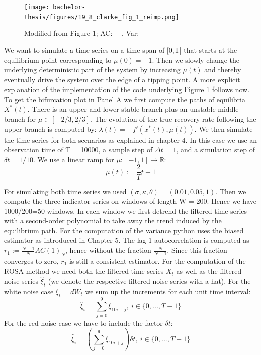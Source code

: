 \documentclass[%
thesis=student,%
coverpage=false,%
titlepage=false,%
headmarks=true, %
english,%
font=libertine, %
math=newpxtx, %
BCOR=5mm,%
coverBCOR=11mm%
]{tumbook}
\begin{document}
\begin{figure}
    \centering
    \texttt{[image: bachelor-thesis/figures/19\_8\_clarke\_fig\_1\_reimp.png]}
    \caption{Modified from \cite{Clarke:2023} Figure 1; AC: ---, Var: - - -}
    \label{success_of_trad_ews_and_rosa}
\end{figure}

We want to simulate a time series on a time span of [0,T] that starts at the equilibrium point corresponding to $\mu(0) = -1$. Then we slowly change the underlying deterministic part of the system by increasing $\mu(t)$ and thereby eventually drive the system over the edge of a tipping point. A more explicit explanation of the implementation of the code underlying Figure \ref{success_of_trad_ews_and_rosa} follows now. To get the bifurcation plot in Panel A we first compute the paths of equilibria $X^{*}(t)$. There is an upper and lower stable branch plus an unstable middle branch for $\mu \in [-2/3,2/3]$. The evolution of the true recovery rate following the upper branch is computed by: $\lambda(t) = -f'(x^{*}(t),\mu(t))$. We then simulate the time series for both scenarios as explained in chapter 4. In this case we use an observation time of T = 10000, a sample step of $\Delta t = 1$, and a simulation step of $\delta t = 1/10$. We use a linear ramp for $\mu:  [-1,1] \rightarrow \mathbb{R}$:
\[
\mu(t) := \frac{2}{T}t-1
\]

For simulating both time series we used $(\sigma,\kappa,\theta) = (0.01,0.05,1)$. 
Then we compute the three indicator series on windows of length W = 200. Hence we have 1000/200=50 windows. In each window we first detrend the filtered time series with a second-order polynomial to take away the trend induced by the equilibrium path. For the computation of the variance python uses the biased estimator as introduced in Chapter 5. The lag-1 autocorrelation is computed as $r_{1} := \frac{N-1}{N}AC(1)_{N}$, hence without the fraction $\frac{N}{N-1}$. Since this fraction converges to zero, $r_{1}$ is still a consistent estimator. For the computation of the ROSA method we need both the filtered time series $X_{t}$ as well as the filtered noise series $\widehat{\xi}_{t}$ (we denote the respective filtered noise series with a hat). For the white noise case $\xi_{t} = dW_{t}$ we sum up the increments for each unit time interval:
\[
\widehat{\xi}_{i} = \sum_{j = 0}^{9}\xi_{10i+j}, \ i \in \{0,...,T-1\}
\]
For the red noise case we have to include the factor $\delta t$:
\[
\widehat{\xi}_{i} = (\sum_{j = 0}^{9}\xi_{10i+j})\delta t, \ i \in \{0,...,T-1\}
\]
\end{document}
